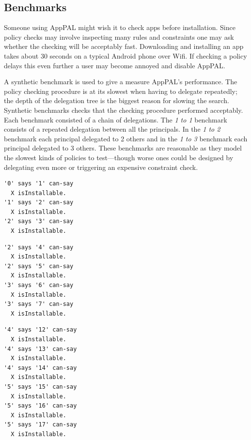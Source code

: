 \documentclass[thesis.tex]{subfiles}
\begin{document}
\subsection{Benchmarks}
\label{ssec:benchmarks}

Someone using AppPAL might wish it to check apps before installation.
Since policy checks may involve inspecting many rules and constraints one may ask whether the checking will be acceptably fast.
Downloading and installing an app takes about 30 seconds on a typical Android phone over Wifi.
If checking a policy delays this even further a user may become annoyed and disable AppPAL.

A synthetic benchmark is used to give a measure AppPAL's performance.
The policy checking procedure is at its slowest when having to delegate repeatedly;
  the depth of the delegation tree is the biggest reason for slowing the search.
Synthetic benchmarks checks that the checking procedure performed acceptably.
Each benchmark consisted of a chain of delegations.
The \emph{1 to 1} benchmark consists of a repeated delegation between all the principals.
In the \emph{1 to 2} benchmark each principal delegated to 2 others and in the \emph{1 to 3} benchmark each principal delegated to 3 others.
These benchmarks are reasonable as they model the slowest kinds of policies to test---though worse ones could be designed by delegating even more or triggering an expensive constraint check.

\noindent
\begin{minipage}{.30\textwidth}
\begin{lstlisting}[caption={Excerpt of policy from 1 to 1 benchmark.}, basicstyle=\ttfamily\footnotesize]
'0' says '1' can-say
  X isInstallable.
'1' says '2' can-say
  X isInstallable.
'2' says '3' can-say
  X isInstallable.
\end{lstlisting}
\end{minipage}\hfill
\begin{minipage}{.30\textwidth}
\begin{lstlisting}[caption={Excerpt of policy from 1 to 2 benchmark.}, basicstyle=\ttfamily\footnotesize]
'2' says '4' can-say
  X isInstallable.
'2' says '5' can-say
  X isInstallable.
'3' says '6' can-say
  X isInstallable.
'3' says '7' can-say
  X isInstallable.
\end{lstlisting}
\end{minipage}\hfill
\begin{minipage}{.30\textwidth}
\begin{lstlisting}[caption={Excerpt of policy from 1 to 3 benchmark.}, basicstyle=\ttfamily\footnotesize]
'4' says '12' can-say
  X isInstallable.
'4' says '13' can-say
  X isInstallable.
'4' says '14' can-say
  X isInstallable.
'5' says '15' can-say
  X isInstallable.
'5' says '16' can-say
  X isInstallable.
'5' says '17' can-say
  X isInstallable.
\end{lstlisting}
\end{minipage}
\end{document}

